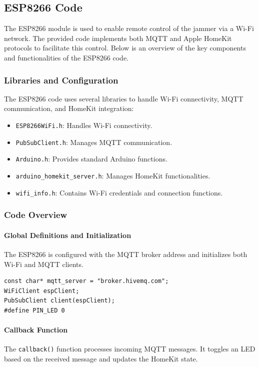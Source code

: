 \subsection{ESP8266 Code}

The ESP8266 module is used to enable remote control of the jammer via a Wi-Fi network. The provided code implements both MQTT and Apple HomeKit protocols to facilitate this control. Below is an overview of the key components and functionalities of the ESP8266 code.

\subsubsection{Libraries and Configuration}

The ESP8266 code uses several libraries to handle Wi-Fi connectivity, MQTT communication, and HomeKit integration:
\begin{itemize}
    \item \texttt{ESP8266WiFi.h}: Handles Wi-Fi connectivity.
    \item \texttt{PubSubClient.h}: Manages MQTT communication.
    \item \texttt{Arduino.h}: Provides standard Arduino functions.
    \item \texttt{arduino\_homekit\_server.h}: Manages HomeKit functionalities.
    \item \texttt{wifi\_info.h}: Contains Wi-Fi credentials and connection functions.
\end{itemize}

\subsubsection{Code Overview}

\paragraph{Global Definitions and Initialization}
The ESP8266 is configured with the MQTT broker address and initializes both Wi-Fi and MQTT clients.

\begin{verbatim}
const char* mqtt_server = "broker.hivemq.com";
WiFiClient espClient;
PubSubClient client(espClient);
#define PIN_LED 0 
\end{verbatim}

\paragraph{Callback Function}
The \texttt{callback()} function processes incoming MQTT messages. It toggles an LED based on the received message and updates the HomeKit state.

